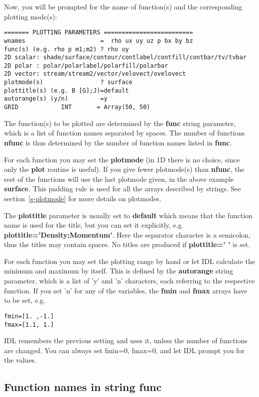    Now, you will be prompted 
   for the name of function(s) and the corresponding plotting mode(s):
\begin{verbatim}
======= PLOTTING PARAMETERS =========================
wnames                     =  rho ux uy uz p bx by bz
func(s) (e.g. rho p m1;m2) ? rho uy
2D scalar: shade/surface/contour/contlabel/contfill/contbar/tv/tvbar
2D polar : polar/polarlabel/polarfill/polarbar
2D vector: stream/stream2/vector/velovect/ovelovect
plotmode(s)                ? surface
plottitle(s) (e.g. B [G];J)=default
autorange(s) (y/n)         =y
GRID            INT       = Array(50, 50)
\end{verbatim}
   The function(s) to be plotted are determined by the {\bf func}
   string parameter, which is a list of function names separated by spaces.
   The number of functions {\bf nfunc} is thus determined by the number of
   function names listed in {\bf func}. 

   For each function you may set the {\bf plotmode} (in 1D there is no
   choice, since only the {\bf plot} routine is useful). 
   If you give fewer plotmode(s) than {\bf nfunc}, the rest of
   the functions will use the last plotmode given, in the above example
   {\bf surface}. This padding rule is used for all the arrays described 
   by strings. See section~\ref{s-plotmode} for more details on plotmodes.

   The {\bf plottitle} parameter is usually set to {\bf default} which
   means that the function name is used for the title, but you can set it
   explicitly, e.g. {\bf plottitle='Density;Momentum'}. Here the 
   separator character is a semicolon, thus the titles may contain spaces.
   No titles are produced if {\bf plottitle=' '} is set.

   For each function you may set the plotting range by hand or let IDL
   calculate the minimum and maximum by itself. This is defined by
   the {\bf autorange} string parameter, which is a list of 'y' and 'n'
   characters, each referring to the respective function. If you set 'n'
   for any of the variables, the {\bf fmin} and {\bf fmax} arrays have
   to be set, e.g.
\begin{verbatim}
fmin=[1. ,-1.]
fmax=[1.1, 1.]
\end{verbatim}
   IDL remembers the previous setting and uses it, unless the number
   of functions are changed. You can always set fmin=0, fmax=0, and let
   IDL prompt you for the values.

\subsection{Function names in string func \label{s-functions}}

